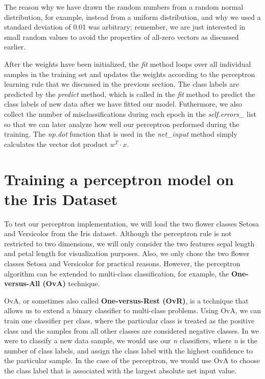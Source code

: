 \documentclass[11pt]{article}
\begin{document}
    The reason why we have drawn the random numbers from a random normal
distribution, for example, instead from a uniform distribution, and why
we used a standard deviation of 0.01 was arbitrary; remember, we are
just interested in small random values to avoid the properties of
all-zero vectors as discussed earlier.

    After the weights have been initialized, the \emph{fit} method loops
over all individual samples in the training set and updates the weights
according to the perceptron learning rule that we discussed in the
previous section. The class labels are predicted by the \emph{predict}
method, which is called in the \emph{fit} method to predict the class
labels of new data after we have fitted our model. Futhermore, we also
collect the number of misclassifications during each epoch in the
\emph{self.errors\_} list so that we can later analyze how well our
perceptron performed during the training. The \emph{np.dot} function
that is used in the \emph{net\_input} method simply calculates the
vector dot product \(w^T \cdot x\).

    \section{Training a perceptron model on the Iris
Dataset}\label{training-a-perceptron-model-on-the-iris-dataset}

    To test our perceptron implementation, we will load the two flower
classes Setosa and Versicolor from the Iris dataset. Although the
perceptron rule is not restricted to two dimensions, we will only
consider the two features sepal length and petal length for
visualization purposes. Also, we only chose the two flower classes
Setosa and Versicolor for practical reasons. However, the perceptron
algorithm can be extended to multi-class classification, for example,
the \textbf{One-versus-All (OvA)} technique.

    OvA, or sometimes also called \textbf{One-versus-Rest (OvR)}, is a
technique that allows us to extend a binary classifier to multi-class
problems. Using OvA, we can train one classifier per class, where the
particular class is treated as the positive class and the samples from
all other classes are considered negative classes. In we were to
classify a new data sample, we would use our \emph{n} classifiers, where
\emph{n} is the number of class labels, and assign the class label with
the highest confidence to the particular sample. In the case of the
perceptron, we would use OvA to choose the class label that is
associated with the largest absolute net input value.
\end{document}
